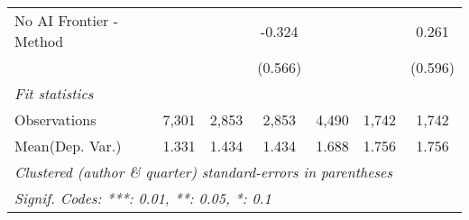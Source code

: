 \begin{tabular}{lcccccc}
   No AI Frontier - Method &              &              & -0.324      &              &         & 0.261\\   
                           &              &              & (0.566)     &              &         & (0.596)\\   
   \midrule
   \emph{Fit statistics}\\
   Observations            & 7,301        & 2,853        & 2,853       & 4,490        & 1,742   & 1,742\\  
Mean(Dep. Var.) & 1.331 & 1.434 & 1.434 & 1.688 & 1.756 & 1.756 \\
   \midrule \midrule
   \multicolumn{7}{l}{\emph{Clustered (author \& quarter) standard-errors in parentheses}}\\
   \multicolumn{7}{l}{\emph{Signif. Codes: ***: 0.01, **: 0.05, *: 0.1}}\\
\end{tabular}
\par\endgroup
